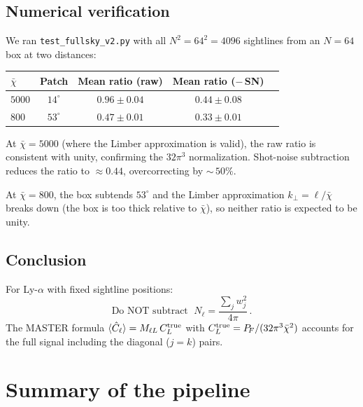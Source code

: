 \documentclass[11pt,a4paper]{article}
\newcommand{\chibar}{\bar{\chi}}
\newcommand{\PF}{P_{\!F}}
\newcommand{\Cl}{\hat{C}_\ell}
\begin{document}
\subsection{Numerical verification}

We ran \texttt{test\_fullsky\_v2.py} with all $N^2 = 64^2 = 4096$
sightlines from an $N{=}64$ box at two distances:

\begin{center}
\begin{tabular}{lcccc}
\hline
$\chibar$ & Patch & Mean ratio (raw) & Mean ratio ($-$\,SN) \\
\hline
$5000$ & $14^\circ$ & $0.96 \pm 0.04$ & $0.44 \pm 0.08$ \\
$800$ & $53^\circ$ & $0.47 \pm 0.01$ & $0.33 \pm 0.01$ \\
\hline
\end{tabular}
\end{center}

At $\chibar = 5000$ (where the Limber approximation is valid), the
raw ratio is consistent with unity, confirming the $32\pi^3$ normalization.
Shot-noise subtraction reduces the ratio to $\approx 0.44$, overcorrecting
by ${\sim}\,50\%$.

At $\chibar = 800$, the box subtends $53^\circ$ and the Limber approximation
$k_\perp = \ell/\chibar$ breaks down (the box is too thick relative to
$\chibar$), so neither ratio is expected to be unity.

\subsection{Conclusion}
For Ly-$\alpha$ with fixed sightline positions:
\begin{equation}
  \boxed{
    \text{Do NOT subtract }\;
    N_\ell = \frac{\sum_j w_j^2}{4\pi}\,.
  }
\end{equation}
The MASTER formula $\langle\Cl\rangle = M_{\ell L}\,C_L^{\rm true}$ with
$C_L^{\rm true} = \PF/(32\pi^3\chibar^2)$ accounts for the full signal
including the diagonal ($j{=}k$) pairs.

\section{Summary of the pipeline}
\end{document}
